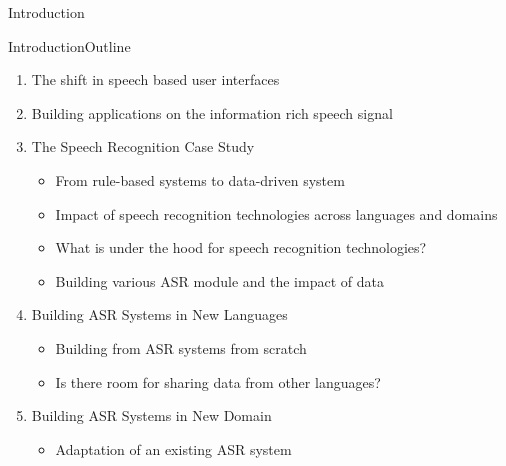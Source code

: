 \newcommand{\foo}{\hspace{-2.3pt}$\bullet$ \hspace{5pt}}

\begin{frame}
  \begin{center}
    {\color{Maroon}\Huge Introduction}
  \end{center}
\end{frame}

\begin{frame}{Introduction}{Outline}
  \begin{enumerate}
  \item The shift in speech based user interfaces
  \item Building applications on the information rich speech signal
  \item The Speech Recognition Case Study
    \begin{itemize}
    \item From rule-based systems to data-driven system
    \item Impact of speech recognition technologies across languages and domains
    \item What is under the hood for speech recognition technologies?
    \item Building various ASR module and the impact of data
    \end{itemize}
  \item Building ASR Systems in New Languages
    \begin{itemize}
    \item Building from ASR systems from scratch
    \item Is there room for sharing data from other languages?
    \end{itemize}
  \item Building ASR Systems in New Domain
    \begin{itemize}
    \item Adaptation of an existing ASR system
    \end{itemize}
  \end{enumerate}
\end{frame}

